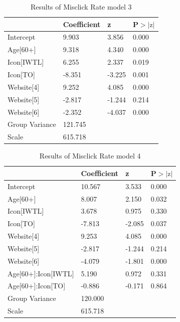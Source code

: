 \documentclass[12pt,twoside]{reedthesis}
\begin{document}
    \begin{table}[H]
        \centering
        \begin{tabular}{| p{3.5cm} | p{2.5cm} | p{2.5cm} | p{2.5cm} |}
            \hline
            & Coefficient & z & P$>|\text{z}|$\\
            \hline
            Intercept & 9.903 & 3.856 & 0.000\\
            \hline
            Age[60+] & 9.318 & 4.340 & 0.000\\
            \hline
            Icon[IWTL] & 6.255 & 2.337 & 0.019\\
            \hline
            Icon[TO] & -8.351 & -3.225 & 0.001\\
            \hline
            Website[4] & 9.252 & 4.085 & 0.000\\
            \hline
            Website[5] & -2.817 & -1.244 & 0.214\\
            \hline
            Website[6] & -2.352 & -4.037 & 0.000\\
            \hline
            Group Variance & 121.745 &&\\
            \hline
            Scale & 615.718 &&\\
            \hline
        \end{tabular}
        \caption{Results of Misclick Rate model 3}
        \label{no_w1_w3_m3_mr}
    \end{table}

    \begin{table}[H]
        \centering
        \begin{tabular}{| p{5cm} | p{2.5cm} | p{2.5cm} | p{2.5cm} |}
            \hline
            & Coefficient & z & P$>|\text{z}|$\\
            \hline
            Intercept & 10.567 & 3.533 & 0.000\\
            \hline
            Age[60+] & 8.007 &  2.150 & 0.032\\
            \hline
            Icon[IWTL] & 3.678 & 0.975 & 0.330\\
            \hline
            Icon[TO] & -7.813 & -2.085 & 0.037\\
            \hline
            Website[4] & 9.253 & 4.085 & 0.000\\
            \hline
            Website[5] & -2.817 & -1.244 & 0.214\\
            \hline
            Website[6] & -4.079 & -1.801 & 0.000\\
            \hline
            Age[60+]:Icon[IWTL] & 5.190 & 0.972 & 0.331\\
            \hline
            Age[60+]:Icon[TO] & -0.886 & -0.171 & 0.864\\
            \hline
            Group Variance & 120.000 & &\\
            \hline
            Scale & 615.718&&\\
            \hline
        \end{tabular}
        \caption{Results of Misclick Rate model 4}
        \label{no_w1_w3_m4_mr}
    \end{table}
\end{document}
